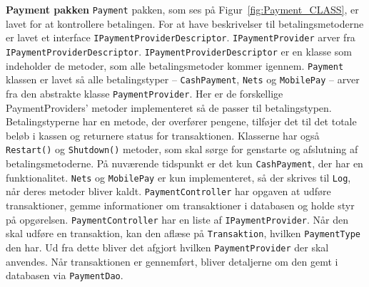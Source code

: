 \textbf{Payment pakken}
\newline
\texttt{Payment} pakken, som ses på Figur~\ref{fig:Payment_CLASS}, er lavet for at kontrollere betalingen. For at have beskrivelser til betalingsmetoderne  er lavet et interface \texttt{IPaymentProviderDescriptor}. \texttt{IPaymentProvider} arver fra \texttt{IPaymentProviderDescriptor}. \texttt{IPaymentProviderDescriptor} er en klasse som indeholder de metoder, som alle betalingsmetoder kommer igennem. \texttt{Payment} klassen er lavet så alle betalingstyper -- \texttt{CashPayment}, \texttt{Nets} og \texttt{MobilePay} -- arver fra den abstrakte klasse \texttt{PaymentProvider}. Her er de forskellige PaymentProviders' metoder implementeret så de passer til betalingstypen. 
\newline\newline
Betalingstyperne har en metode, der overfører pengene, tilføjer det til det totale beløb i kassen og returnere status for transaktionen. Klasserne har også \texttt{Restart()} og \texttt{Shutdown()} metoder, som skal sørge for genstarte og afslutning af betalingsmetoderne. På nuværende tidspunkt er det kun \texttt{CashPayment}, der har en funktionalitet. \texttt{Nets} og \texttt{MobilePay} er kun implementeret, så der skrives til \texttt{Log}, når deres metoder bliver kaldt.  
\newline\newline
\texttt{PaymentController} har opgaven at udføre transaktioner, gemme informationer om transaktioner i databasen og holde styr på opgørelsen. \texttt{PaymentController} har en liste af \texttt{IPaymentProvider}. Når den skal udføre en transaktion, kan den aflæse på \texttt{Transaktion}, hvilken \texttt{PaymentType} den har. Ud fra dette bliver det afgjort hvilken \texttt{PaymentProvider} der skal anvendes. Når transaktionen er gennemført, bliver detaljerne om den gemt i databasen via \texttt{PaymentDao}. 

